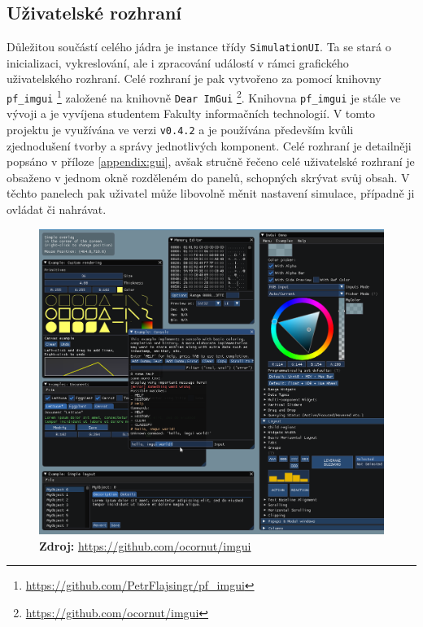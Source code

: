\subsection{Uživatelské rozhraní}
\label{chapter:uzivRozh}

Důležitou součástí celého jádra je instance třídy \texttt{SimulationUI}. Ta se stará o inicializaci, vykreslování, ale i zpracování událostí v rámci grafického uživatelského rozhraní. Celé rozhraní je pak vytvořeno za pomocí knihovny \texttt{pf\_imgui} \footnote{\url{https://github.com/PetrFlajsingr/pf_imgui}} založené na knihovně \texttt{Dear ImGui} \footnote{\url{https://github.com/ocornut/imgui}}. Knihovna \texttt{pf\_imgui} je stále ve vývoji a je vyvíjena studentem Fakulty informačních technologií. V tomto projektu je využívána ve verzi  \texttt{v0.4.2} a je používána především kvůli zjednodušení tvorby a správy jednotlivých komponent. Celé rozhraní je detailněji popsáno v příloze \ref{appendix:gui}, avšak stručně řečeno celé uživatelské rozhraní je obsaženo v jednom okně rozděleném do panelů, schopných skrývat svůj obsah. V těchto panelech pak uživatel může libovolně měnit nastavení simulace, případně ji ovládat či nahrávat.

\begin{figure}[hbt]
	\centering
	\captionsetup{justification=centering}
	\includegraphics[scale=0.25]{obrazky-figures/imgui.png}
	\textbf{Zdroj: } \url{https://github.com/ocornut/imgui}
	\label{fig:structsEvap}
\end{figure}

